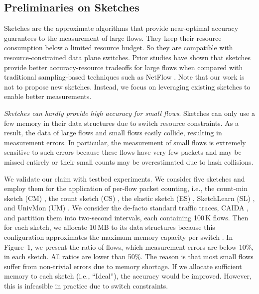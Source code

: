 
\subsection{Preliminaries on Sketches}\label{sketches}

Sketches are the approximate algorithms that provide near-optimal accuracy guarantees to the measurement of large flows. They keep their resource consumption below a limited resource budget. So they are compatible with resource-constrained data plane switches. Prior studies \cite{li2016flowradar,yang2018elastic,huang2017sketchvisor,huang2018sketchlearn,liu2016one,huang2021toward,liu2019nitrosketch,zhang2021cocosketch,namkung2022sketchlib} have shown that sketches provide better accuracy-resource tradeoffs for large flows when compared with traditional sampling-based techniques such as NetFlow \cite{netflow}. Note that our work is not to propose new sketches. Instead, we focus on leveraging existing sketches to enable better measurements. 

 \emph{Sketches can hardly provide high accuracy for small flows}. Sketches can only use a few memory in their data structures due to switch resource constraints. As a result, the data of large flows and small flows easily collide, resulting in measurement errors. In particular, the measurement of small flows is extremely sensitive to such errors because these flows have very few packets and may be missed entirely or their small counts may be overestimated due to hash collisions. 

We validate our claim with testbed experiments. We consider five sketches and employ them for the application of per-flow packet counting, i.e., the count-min sketch (CM) \cite{cormode2005s}, the count sketch (CS) \cite{charikar2004finding}, the elastic sketch (ES) \cite{yang2018elastic}, SketchLearn (SL) \cite{huang2018sketchlearn}, and UnivMon (UM) \cite{liu2016one}. We consider the de-facto standard traffic traces, CAIDA \cite{caida}, and partition them into two-second intervals, each containing 100\,K flows. Then for each sketch, we allocate 10\,MB to its data structures because this configuration approximates the maximum memory capacity per switch \cite{gupta2018sonata}. In Figure~1, we present the ratio of flows, which measurement errors are below 10\%, in each sketch. All ratios are lower than 50\%. The reason is that most small flows suffer from non-trivial errors due to memory shortage. If we allocate sufficient memory to each sketch (i.e., ``Ideal''), the accuracy would be improved. However, this is infeasible in practice due to switch constraints. 

